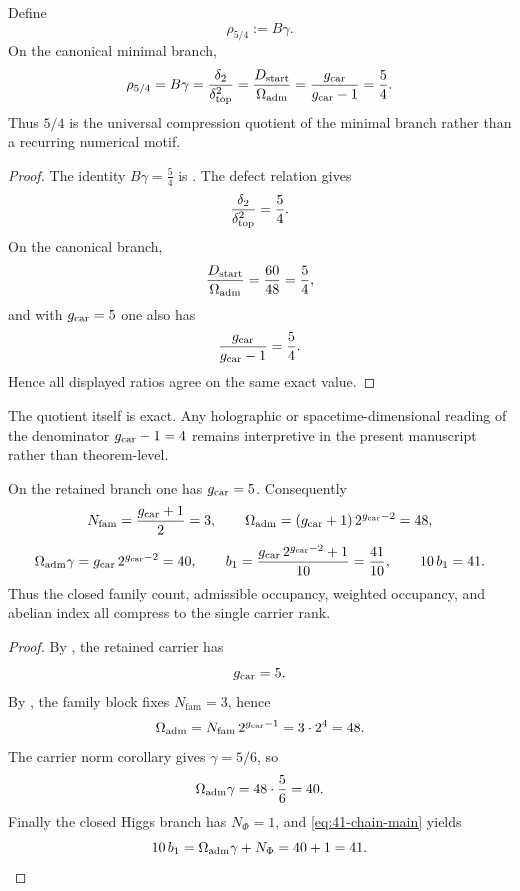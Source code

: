 \begin{lemma}
\label{lem:universal-5-4-compression}
Define
\[
\rho_{5/4}:=B\gamma.
\]
On the canonical minimal branch,
\[
\rho_{5/4}
=
B\gamma
=
\frac{\delta_2}{\delta_{\mathrm{top}}^2}
=
\frac{D_{\mathrm{start}}}{\Omega_{\mathrm{adm}}}
=
\frac{g_{\mathrm{car}}}{g_{\mathrm{car}}-1}
=
\frac54.
\]
Thus $5/4$ is the universal compression quotient of the minimal branch rather than a recurring numerical motif.
\end{lemma}

\begin{proof}
The identity $B\gamma=\frac54$ is . The defect relation gives
\[
\frac{\delta_2}{\delta_{\mathrm{top}}^2}=\frac54.
\]
On the canonical branch,
\[
\frac{D_{\mathrm{start}}}{\Omega_{\mathrm{adm}}}=\frac{60}{48}=\frac54,
\]
and with $g_{\mathrm{car}}=5$ one also has
\[
\frac{g_{\mathrm{car}}}{g_{\mathrm{car}}-1}=\frac{5}{4}.
\]
Hence all displayed ratios agree on the same exact value.
\end{proof}

\begin{remark}
The quotient itself is exact. Any holographic or spacetime-dimensional reading of the denominator $g_{\mathrm{car}}-1=4$ remains interpretive in the present manuscript rather than theorem-level.
\end{remark}

\begin{corollary}
\label{cor:rank-5-master-compression}
On the retained branch one has $g_{\mathrm{car}}=5$. Consequently
\[
N_{\mathrm{fam}}=\frac{g_{\mathrm{car}}+1}{2}=3,
\qquad
\Omega_{\mathrm{adm}}=(g_{\mathrm{car}}+1)\,2^{g_{\mathrm{car}}-2}=48,
\]
\[
\Omega_{\mathrm{adm}}\gamma=g_{\mathrm{car}}\,2^{g_{\mathrm{car}}-2}=40,
\qquad
b_1=\frac{g_{\mathrm{car}}\,2^{g_{\mathrm{car}}-2}+1}{10}=\frac{41}{10},
\qquad
10\,b_1=41.
\]
Thus the closed family count, admissible occupancy, weighted occupancy, and abelian index all
compress to the single carrier rank.
\end{corollary}

\begin{proof}
By , the retained carrier has
\[
g_{\mathrm{car}}=5.
\]
By , the family block fixes $N_{\mathrm{fam}}=3$, hence
\[
\Omega_{\mathrm{adm}}=N_{\mathrm{fam}}\,2^{g_{\mathrm{car}}-1}=3\cdot 2^4=48.
\]
The carrier norm corollary gives $\gamma=5/6$, so
\[
\Omega_{\mathrm{adm}}\gamma=48\cdot\frac56=40.
\]
Finally the closed Higgs branch has $N_\Phi=1$, and \eqref{eq:41-chain-main} yields
\[
10\,b_1=\Omega_{\mathrm{adm}}\gamma+N_\Phi=40+1=41.
\]
\end{proof}

